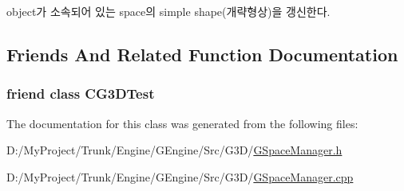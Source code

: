 \begin{DoxyItemize}
\item object가 소속되어 있는 space의 simple shape(개략형상)을 갱신한다. 
\end{DoxyItemize}

\subsection{Friends And Related Function Documentation}
\hypertarget{class_c_g_space_manager_a0066bb24d9976fa6f552be214b59e211}{}
\subsubsection[{C\+G3\+D\+Test}]{\setlength{\rightskip}{0pt plus 5cm}friend class {\bf C\+G3\+D\+Test}\hspace{0.3cm}{\ttfamily [friend]}}\label{class_c_g_space_manager_a0066bb24d9976fa6f552be214b59e211}


The documentation for this class was generated from the following files\+:\begin{DoxyCompactItemize}
\item 
D\+:/\+My\+Project/\+Trunk/\+Engine/\+G\+Engine/\+Src/\+G3\+D/\hyperlink{_g_space_manager_8h}{G\+Space\+Manager.\+h}\item 
D\+:/\+My\+Project/\+Trunk/\+Engine/\+G\+Engine/\+Src/\+G3\+D/\hyperlink{_g_space_manager_8cpp}{G\+Space\+Manager.\+cpp}\end{DoxyCompactItemize}
